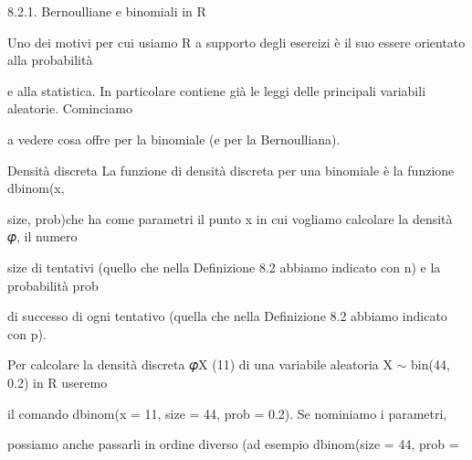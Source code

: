 \documentclass[a4paper,portrait,12pt]{article}
\begin{document}
\begin{flushleft}
8.2.1. Bernoulliane e binomiali in R
\end{flushleft}


\begin{flushleft}
Uno dei motivi per cui usiamo R a supporto degli esercizi \`{e} il suo essere orientato alla probabilit\`{a}
\end{flushleft}


\begin{flushleft}
e alla statistica. In particolare contiene gi\`{a} le leggi delle principali variabili aleatorie. Cominciamo
\end{flushleft}


\begin{flushleft}
a vedere cosa offre per la binomiale (e per la Bernoulliana).
\end{flushleft}


\begin{flushleft}
Densit\`{a} discreta La funzione di densit\`{a} discreta per una binomiale \`{e} la funzione dbinom(x,
\end{flushleft}


\begin{flushleft}
size, prob)che ha come parametri il punto x in cui vogliamo calcolare la densit\`{a} 𝜑, il numero
\end{flushleft}


\begin{flushleft}
size di tentativi (quello che nella Definizione 8.2 abbiamo indicato con n) e la probabilit\`{a} prob
\end{flushleft}


\begin{flushleft}
di successo di ogni tentativo (quella che nella Definizione 8.2 abbiamo indicato con p).
\end{flushleft}


\begin{flushleft}
Per calcolare la densit\`{a} discreta 𝜑X (11) di una variabile aleatoria X $\sim$ bin(44, 0.2) in R useremo
\end{flushleft}


\begin{flushleft}
il comando dbinom(x = 11, size = 44, prob = 0.2). Se nominiamo i parametri,
\end{flushleft}


\begin{flushleft}
possiamo anche passarli in ordine diverso (ad esempio dbinom(size = 44, prob =
\end{flushleft}
\end{document}
